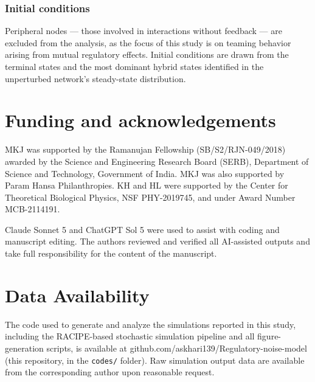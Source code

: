 \documentclass[11pt]{article}
\newcommand{\beginsupplement}{%
        \setcounter{table}{0}
        \renewcommand{\thetable}{S\arabic{table}}%
        \setcounter{figure}{0}
        \renewcommand{\thefigure}{S\arabic{figure}}%
        \setcounter{section}{0}
        \renewcommand{\thesection}{S\arabic{section}}%
     }
\begin{document}
\subsubsection{Initial conditions}

Peripheral nodes — those involved in interactions without feedback — are excluded from the analysis, as the focus of this study is on teaming behavior arising from mutual regulatory effects. Initial conditions are drawn from the terminal states and the most dominant hybrid states identified in the unperturbed network's steady-state distribution.

\section{Funding and acknowledgements}

MKJ was supported by the Ramanujan Fellowship (SB/S2/RJN-049/2018) awarded by the Science and Engineering Research Board (SERB), Department of Science and Technology, Government of India. MKJ was also supported by Param Hansa Philanthropies. KH and HL were supported by the Center for Theoretical Biological Physics, NSF PHY-2019745, and under Award Number MCB-2114191. 

Claude Sonnet 5 and ChatGPT Sol 5 were used to assist with coding and manuscript editing. The authors reviewed and verified all AI-assisted outputs and take full responsibility for the content of the manuscript.

\section{Data Availability}

The code used to generate and analyze the simulations reported in this study, including the RACIPE-based stochastic simulation pipeline and all figure-generation scripts, is available at github.com/askhari139/Regulatory-noise-model (this repository, in the \texttt{codes/} folder). Raw simulation output data are available from the corresponding author upon reasonable request.

\printbibliography

\beginsupplement



% 
% 
\clearpage

\newpage
\clearpage

        
\end{document}
